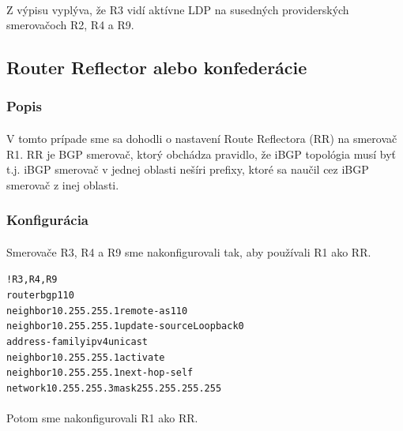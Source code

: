 \documentclass[12pt,twoside,a4paper]{report}
\begin{document}
\paragraph{}
Z výpisu vyplýva, že R3 vidí aktívne LDP na susedných providerských smerovačoch R2, R4 a R9.














\subsection{Router Reflector alebo konfederácie}
\subsubsection{Popis}
\paragraph{}
V tomto prípade sme sa dohodli o nastavení Route Reflectora (RR) na smerovač R1. RR je BGP smerovač, ktorý obchádza pravidlo, že iBGP topológia musí byť  t.j. iBGP smerovač v jednej oblasti nešíri prefixy, ktoré sa naučil cez iBGP smerovač z inej oblasti.



\subsubsection{Konfigurácia}
\paragraph{}
Smerovače R3, R4 a R9 sme nakonfigurovali tak, aby používali R1 ako RR.

\noindent
{\selectfont
\begin{small}
\begin{alltt}
!R3, R4, R9
router bgp 110
  neighbor 10.255.255.1 remote-as 110
  neighbor 10.255.255.1 update-source Loopback0
  address-family ipv4 unicast
    neighbor 10.255.255.1 activate
    neighbor 10.255.255.1 next-hop-self
  network 10.255.255.3 mask 255.255.255.255
\end{alltt}
\end{small}
}

\paragraph{}
Potom sme nakonfigurovali R1 ako RR.
\end{document}
